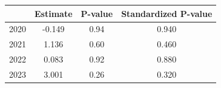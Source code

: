 \begin{tabular}{lccc}
\hline
 & Estimate & P-value & Standardized P-value \\
\hline
2020 & -0.149 & 0.94 & 0.940 \\
2021 & 1.136 & 0.60 & 0.460 \\
2022 & 0.083 & 0.92 & 0.880 \\
2023 & 3.001 & 0.26 & 0.320 \\
\hline
\end{tabular}

